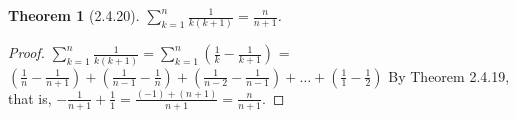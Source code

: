 \documentclass[a4paper, 12pt]{article}
\theoremstyle{plain}
\newtheorem*{theorem*}{Theorem}
\begin{document}
	
	\begin{theorem*}[2.4.20]
		$\sum_{k=1}^{n} \frac{1}{k(k+1)} = \frac{n}{n+1}$.
	\end{theorem*}
	
	\begin{proof}
		$\sum_{k=1}^{n} \frac{1}{k(k+1)} = \sum_{k=1}^{n} (\frac{1}{k} - \frac{1}{k+1})$ = \newline
		$(\frac{1}{n} - \frac{1}{n+1}) + (\frac{1}{n-1} - \frac{1}{n}) + 
		(\frac{1}{n-2} - \frac{1}{n-1}) + \dots + 
		(\frac{1}{1} - \frac{1}{2})
		$ By Theorem 2.4.19, that is, $-\frac{1}{n+1} + \frac{1}{1} = \frac{(-1) + (n+1)}{n+1} = \frac{n}{n+1}$.
	\end{proof}
\end{document}
